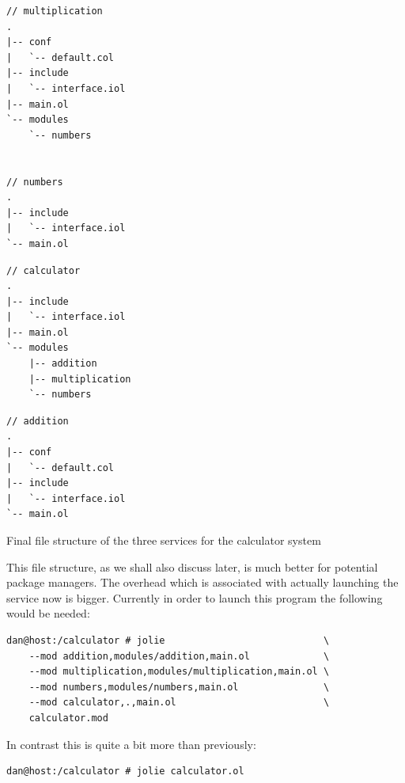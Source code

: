 \begin{listing}[H]

\begin{multicols}{3}

\begin{verbatim}
// multiplication
.
|-- conf
|   `-- default.col
|-- include
|   `-- interface.iol
|-- main.ol
`-- modules
    `-- numbers


// numbers
.
|-- include
|   `-- interface.iol
`-- main.ol
\end{verbatim}

\columnbreak

\begin{verbatim}
// calculator
.
|-- include
|   `-- interface.iol
|-- main.ol
`-- modules
    |-- addition
    |-- multiplication
    `-- numbers
\end{verbatim}

\columnbreak

\begin{verbatim}
// addition
.
|-- conf
|   `-- default.col
|-- include
|   `-- interface.iol
`-- main.ol
\end{verbatim}

\end{multicols}

\caption{Final file structure of the three services for the calculator system}
\label{lst:final_file_structure}
\end{listing}

This file structure, as we shall also discuss later, is much better for
potential package managers. The overhead which is associated with actually
launching the service now is bigger. Currently in order to launch this program
the following would be needed:

\begin{verbatim}
dan@host:/calculator # jolie                            \
    --mod addition,modules/addition,main.ol             \
    --mod multiplication,modules/multiplication,main.ol \
    --mod numbers,modules/numbers,main.ol               \
    --mod calculator,.,main.ol                          \
    calculator.mod
\end{verbatim}

In contrast this is quite a bit more than previously:

\begin{verbatim}
dan@host:/calculator # jolie calculator.ol
\end{verbatim}

